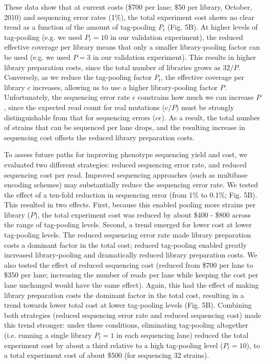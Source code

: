 \documentclass[letterpaper,10pt,english]{howto}
\begin{document}
These data show that at current costs (\$700 per lane; \$50 per library,
October, 2010) and sequencing error rates (1\%),
the total experiment cost shows no clear trend as a function of the amount
of tag-pooling $P_t$ (Fig. 5B).  At higher levels
of tag-pooling (e.g. we used $P_t=10$ in our validation
experiment), the reduced effective coverage per library means
that only a smaller library-pooling factor can be
used (e.g. we used $P=3$ in our validation experiment).
This results in higher library preparation costs, since the
total number of libraries grows as $32/P$.  Conversely,
as we reduce the tag-pooling factor $P_t$,
the effective coverage per library $c$ increases,
allowing us to use a higher library-pooling factor $P$.
Unfortunately, the sequencing error rate $\epsilon$ constrains
how much we can increase $P$, since the expected read count
for real mutations ($c/P$) must be strongly distinguishable
from that for sequencing errors ($c\epsilon$).
As a result, the total number of strains that can be sequenced
per lane drops, and the resulting increase in sequencing cost
offsets the reduced library preparation costs.

To assess future paths for improving phenotype sequencing yield
and cost, we evaluated two different strategies: reduced sequencing
error rate, and reduced sequencing cost per read.  Improved
sequencing approaches (such as multibase encoding schemes) may
substantially reduce the sequencing error rate.  We tested the
effect of a ten-fold reduction in sequencing error (from 1\% to 0.1\%;
Fig. 5B).  This resulted in two effects.  First, because this
enabled pooling more strains per library ($P$), the total experiment
cost was reduced by about \$400 - \$800 across the range of tag-pooling
levels.  Second, a trend emerged for lower cost at lower
tag-pooling levels.  The reduced sequencing error rate made
library preparation costs a dominant factor in the total cost;
reduced tag-pooling enabled greatly increased library-pooling and
dramatically reduced library preparation costs.  We also tested the
effect of reduced sequencing cost (reduced from \$700 per lane to
\$350 per lane; increasing the number of reads per lane while
keeping the cost per lane unchanged would have the same effect).
Again, this had the effect of making library preparation costs
the dominant factor in the total cost, resulting in a
trend towards lower total cost at lower tag-pooling levels (Fig. 5B).
Combining both strategies (reduced sequencing error rate and
reduced sequencing cost) made this trend stronger: under these conditions,
eliminating tag-pooling altogether (i.e. running a single library
$P_t=1$ in each sequencing lane) reduced the total experiment
cost by about a third relative to a high tag-pooling level ($P_t=10$),
to a total experiment cost of about \$500 (for sequencing 32 strains).
\end{document}
